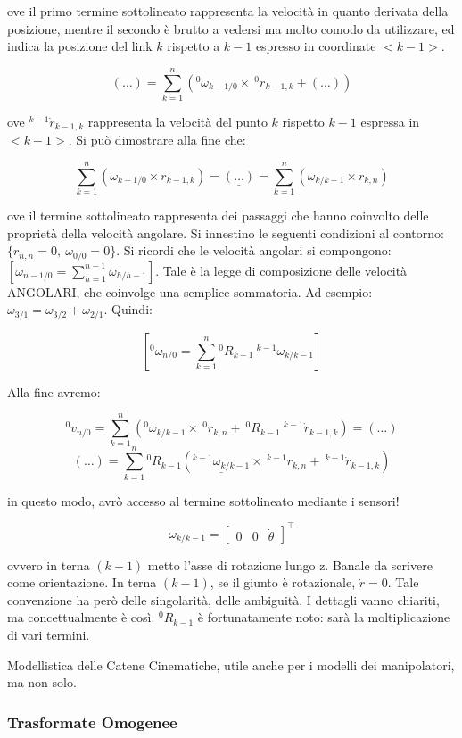 ove il primo termine sottolineato rappresenta la velocità in quanto derivata della posizione, mentre il secondo è brutto a vedersi ma molto comodo da utilizzare, ed indica la posizione del link $k$ rispetto a $k-1$ espresso in coordinate $<k-1>$. 

\[
	(\dots) = \sum_{k=1}^n{(^0\omega_{k-1/0}\times\ ^0r_{k-1,k} + (\dots))}
\]

ove $^{k-1}\dot{r}_{k-1,k}$ rappresenta la velocità del punto $k$ rispetto $k-1$ espressa in $<k-1>$. Si può dimostrare alla fine che:

\[
	\sum_{k=1}^n{(\omega_{k-1/0}\times r_{k-1,k})} = \underline{(\dots)} = \sum_{k=1}^n{(\omega_{k/k-1}\times r_{k,n})}
\]

ove il termine sottolineato rappresenta dei passaggi che hanno coinvolto delle proprietà della velocità angolare. Si innestino le seguenti condizioni al contorno: $\{r_{n,n}=0,\ \omega_{0/0}=0\}$. Si ricordi che le velocità angolari si compongono: $[\omega_{n-1/0}=\sum_{h=1}^{n-1}{\omega_{h/h-1}}]$. Tale è la legge di composizione delle velocità ANGOLARI, che coinvolge una semplice sommatoria. Ad esempio: $\omega_{3/1} = \omega_{3/2}+\omega_{2/1}$. Quindi:

\[
	[^0\omega_{n/0} = \sum_{k=1}^n{^0R_{k-1}\ ^{k-1}\omega_{k/k-1}}]
\]

Alla fine avremo:

\[
	^0v_{n/0} = \sum_{k=1}^n{(^0\omega_{k/k-1}\times\ ^0r_{k,n} +\ ^0R_{k-1}\ ^{k-1}\dot{r}_{k-1,k})} = (\dots)
\]
\[
	(\dots) = \sum_{k=1}^n{^0R_{k-1}(\underline{^{k-1}\omega_{k/k-1}}\times\ ^{k-1}r_{k,n} +\ ^{k-1}\dot{r}_{k-1,k})}
\]

in questo modo, avrò accesso al termine sottolineato mediante i sensori!

\[
	\omega_{k/k-1}=\begin{bmatrix}0&0&\dot{\theta}\end{bmatrix}^\top
\]

ovvero in terna $(k-1)$ metto l'asse di rotazione lungo z. Banale da scrivere come orientazione. In terna $(k-1)$, se il giunto è rotazionale, $\dot{r}=0$. Tale convenzione ha però delle singolarità, delle ambiguità. I dettagli vanno chiariti, ma concettualmente è così. $^0R_{k-1}$ è fortunatamente noto: sarà la moltiplicazione di vari termini. 

Modellistica delle Catene Cinematiche, utile anche per i modelli dei manipolatori, ma non solo.

\subsubsection{Trasformate Omogenee}

